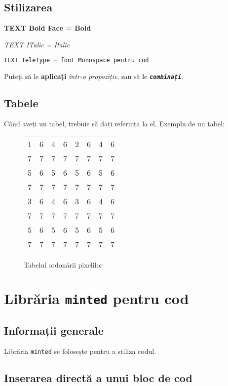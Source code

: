 \documentclass[a4paper,12pt]{report}
\begin{document}
\subsection{Stilizarea}

\textbf{TEXT Bold Face = Bold}

\textit{TEXT ITalic = Italic}

\texttt{TEXT TeleType = font Monospace pentru cod}

Puteți să le \textbf{aplicați} \textit{într-o propoziție}, sau să le \texttt{\textit{\textbf{combinați}}}.


\subsection{Tabele}

Când aveți un tabel, trebuie să dați referința la el.
Exemplu de un tabel: 

\begin{figure}[!ht]
\centering
\begin{tabular}{c c c c c c c c}
    1 & 6 & 4 & 6 & 2 & 6 & 4 & 6 \\
    7 & 7 & 7 & 7 & 7 & 7 & 7 & 7 \\
    5 & 6 & 5 & 6 & 5 & 6 & 5 & 6 \\
    7 & 7 & 7 & 7 & 7 & 7 & 7 & 7 \\
    3 & 6 & 4 & 6 & 3 & 6 & 4 & 6 \\
    7 & 7 & 7 & 7 & 7 & 7 & 7 & 7 \\
    5 & 6 & 5 & 6 & 5 & 6 & 5 & 6 \\
    7 & 7 & 7 & 7 & 7 & 7 & 7 & 7 \\
\end{tabular}
\caption{Tabelul ordonării pixelilor}
\label{fig:pixel_order_table}
\end{figure}


\section{Librăria \verb|minted| pentru cod}

\subsection{Informații generale}

Librăria \verb|minted| se folosește pentru a stiliza codul.

\subsection{Inserarea directă a unui bloc de cod}
\end{document}
